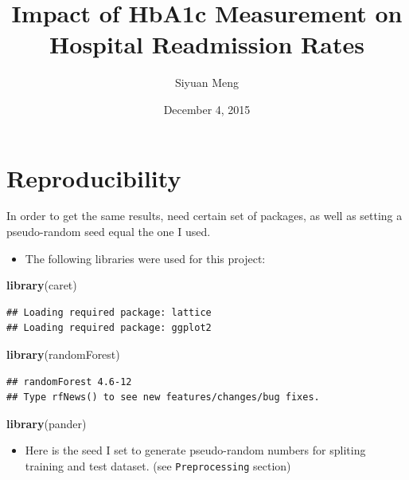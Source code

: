 \documentclass[]{article}
\title{Impact of HbA1c Measurement on Hospital Readmission Rates}
\author{Siyuan Meng}
\date{December 4, 2015}
\newenvironment{Shaded}{\begin{snugshade}}{\end{snugshade}}
\newcommand{\KeywordTok}[1]{\textcolor[rgb]{0.13,0.29,0.53}{\textbf{{#1}}}}
\newcommand{\NormalTok}[1]{{#1}}
\begin{document}
\maketitle


\section{Reproducibility}\label{reproducibility}

In order to get the same results, need certain set of packages, as well
as setting a pseudo-random seed equal the one I used.

\begin{itemize}
\itemsep1pt\parskip0pt
\item
  The following libraries were used for this project:
\end{itemize}

\begin{Shaded}
\begin{Highlighting}[]
\KeywordTok{library}\NormalTok{(caret)}
\end{Highlighting}
\end{Shaded}

\begin{verbatim}
## Loading required package: lattice
## Loading required package: ggplot2
\end{verbatim}

\begin{Shaded}
\begin{Highlighting}[]
\KeywordTok{library}\NormalTok{(randomForest)}
\end{Highlighting}
\end{Shaded}

\begin{verbatim}
## randomForest 4.6-12
## Type rfNews() to see new features/changes/bug fixes.
\end{verbatim}

\begin{Shaded}
\begin{Highlighting}[]
\KeywordTok{library}\NormalTok{(pander)}
\end{Highlighting}
\end{Shaded}

\begin{itemize}
\itemsep1pt\parskip0pt
\item
  Here is the seed I set to generate pseudo-random numbers for spliting
  training and test dataset. (see \texttt{Preprocessing} section)
\end{itemize}
\end{document}
